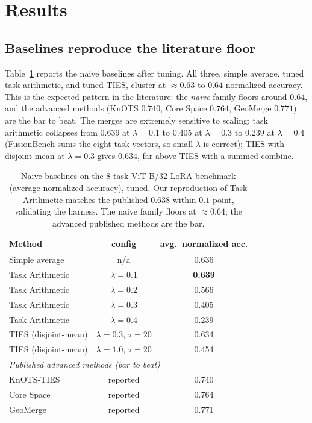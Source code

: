 \documentclass[11pt]{article}
\begin{document}
\section{Results}
\label{sec:results}

\subsection{Baselines reproduce the literature floor}
\label{sec:results-baselines}
Table~\ref{tab:baselines} reports the naive baselines after tuning. All three, simple average, tuned
task arithmetic, and tuned TIES, cluster at $\approx 0.63$ to $0.64$ normalized accuracy. This is the
expected pattern in the literature: the \emph{naive} family floors around $0.64$, and the advanced
methods (KnOTS $0.740$, Core Space $0.764$, GeoMerge $0.771$) are the bar to beat. The merges are
extremely sensitive to scaling: task arithmetic collapses from $0.639$ at $\lambda=0.1$ to $0.405$ at
$\lambda=0.3$ to $0.239$ at $\lambda=0.4$ (FusionBench sums the eight task vectors, so small $\lambda$ is
correct); TIES with disjoint-mean at $\lambda=0.3$ gives $0.634$, far above TIES with a summed combine.

\begin{table}[t]
\centering
\caption{Naive baselines on the $8$-task ViT-B/32 LoRA benchmark (average normalized accuracy), tuned.
Our reproduction of Task Arithmetic matches the published $0.638$ within $0.1$ point, validating the
harness. The naive family floors at $\approx0.64$; the advanced published methods are the bar.}
\label{tab:baselines}
\small
\begin{tabular}{lcc}
\toprule
Method & config & avg.\ normalized acc. \\
\midrule
Simple average & n/a & 0.636 \\
Task Arithmetic & $\lambda=0.1$ & \textbf{0.639} \\
Task Arithmetic & $\lambda=0.2$ & 0.566 \\
Task Arithmetic & $\lambda=0.3$ & 0.405 \\
Task Arithmetic & $\lambda=0.4$ & 0.239 \\
TIES (disjoint-mean) & $\lambda=0.3$, $\tau{=}20$ & 0.634 \\
TIES (disjoint-mean) & $\lambda=1.0$, $\tau{=}20$ & 0.454 \\
\midrule
\multicolumn{3}{l}{\emph{Published advanced methods (bar to beat)}}\\
KnOTS-TIES \citep{stoica2024knots} & reported & 0.740 \\
Core Space \citep{panariello2025corespace} & reported & 0.764 \\
GeoMerge \citep{dasilva2026geomerge} & reported & 0.771 \\
\bottomrule
\end{tabular}
\end{table}
\end{document}
